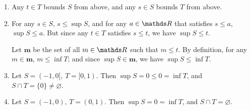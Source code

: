 \documentclass{homework}
\begin{document}
\begin{solution}
  \begin{enumerate}[label=(\alph*)]
    \item Any $t\in T$ bounds $S$ from above, and any $s \in S$ bounds $T$ from above.
    \item For any $s \in S$, $s\le \sup{S}$, and for any $a\in \R$ that satisfies $s\le a$,
      $\sup{S}\le a$. But since any $t\in T$ satisfies $s\le t$, we have $\sup{S}\le t$.

      Let $\textbf{m}$ be the set of all $m\in \R$ such that $m\le t$. By definition, for any $m\in
      \textbf{m}$, $m\le \inf{T}$; and since $\sup{S}\in \textbf{m} $, we have $\sup{S}\le \inf{T}$.

    \item Let $S=(-1,0],\ T=[0,1)$. Then  $\sup{S}=0\le 0=\inf{T}$, and $S\cap T=\{ 0 \}\neq
      \varnothing$.
    \item Let $S=(-1,0),\ T=(0,1)$. Then  $\sup{S}=0=\inf{T}$, and $S\cap T=\varnothing$.
  \end{enumerate}
\end{solution}
\end{document}
